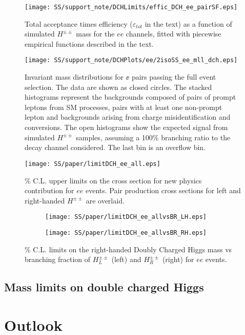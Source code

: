 \begin{figure}[h]
\begin{center}
\texttt{[image: SS/support\_note/DCHLimits/effic\_DCH\_ee\_pairSF.eps]}
\caption{\toDo Total acceptance times efficiency ($\varepsilon_{tot}$ in the text) as a function of simulated $H^{\pm\pm}$ mass for the $ee$ channels, 
fitted with piecewise empirical functions described in the text.}
\label{fig:signal_mass}
\end{center}
\end{figure}


\begin{figure}[h]
\begin{center}
\texttt{[image: SS/support\_note/DCHPlots/ee/2isoSS\_ee\_mll\_dch.eps]}
\caption{\toDo Invariant mass distributions for $\ee$ pairs passing the full event selection. 
The data are shown as closed circles. The stacked histograms represent 
the backgrounds composed of pairs of prompt leptons from SM processes, 
pairs with at least one non-prompt lepton and backgrounds arising from charge misidentification and conversions. 
The open histograms show the expected signal from simulated $H^{\pm\pm}$ samples,
assuming a 100\% branching ratio to the decay channel considered. The last bin is an overflow bin.}
\label{fig:signal_mass}
\end{center}
\end{figure}


\begin{figure}[h]
\begin{center}
\texttt{[image: SS/paper/limitDCH\_ee\_all.eps]}
\caption{\% C.L. upper limits on the cross section for new physics contribution for $ee$ events.  
Pair production cross sections for left and right-handed $H^{\pm\pm}$ are overlaid.}
\label{fig:signal_mass}
\end{center}
\end{figure}


\begin{figure}
\begin{subfigure}{.5\textwidth}
  \centering
  \texttt{[image: SS/paper/limitDCH\_ee\_allvsBR\_LH.eps]}
\end{subfigure}%
\begin{subfigure}{.5\textwidth}
  \centering
  \texttt{[image: SS/paper/limitDCH\_ee\_allvsBR\_RH.eps]}
\end{subfigure}
\caption{\% C.L. limits on the right-handed Doubly Charged Higgs mass vs 
branching fraction of $H^{\pm\pm}_L$ (left) and $H^{\pm\pm}_R$ (right) for $ee$ events.}
  \label{fig:signal_kinematics}
\end{figure}



\subsection{Mass limits on double charged Higgs}

\section{Outlook}
\label{sec:wprimeConclusion}

